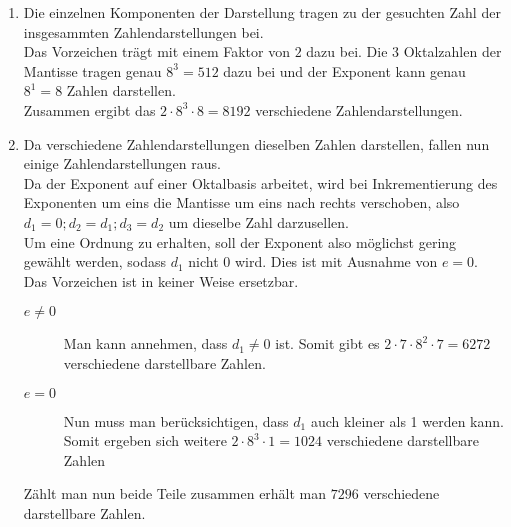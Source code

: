 \documentclass[a4paper,11pt]{article}             %
\begin{document}

\begin{enumerate}

\item Die einzelnen Komponenten der Darstellung tragen zu der gesuchten Zahl der insgesammten Zahlendarstellungen bei.\\
Das Vorzeichen trägt mit einem Faktor von $2$ dazu bei.
Die 3 Oktalzahlen der Mantisse tragen genau $8^3 = 512$ dazu bei
und der Exponent kann genau $8^1 = 8$ Zahlen darstellen.\\
Zusammen ergibt das $2 \cdot 8^3 \cdot 8 = 8192$ verschiedene Zahlendarstellungen.

\item Da verschiedene Zahlendarstellungen dieselben Zahlen darstellen, fallen nun einige Zahlendarstellungen raus.\\
Da der Exponent auf einer Oktalbasis arbeitet, wird bei Inkrementierung des Exponenten um eins die Mantisse um eins nach rechts verschoben, also $d_1 = 0; d_2 = d_1; d_3 = d_2$ um dieselbe Zahl darzusellen.\\
Um eine Ordnung zu erhalten, soll der Exponent also möglichst gering gewählt werden, sodass $d_1$ nicht 0 wird. Dies ist mit Ausnahme von $e=0$.\\
Das Vorzeichen ist in keiner Weise ersetzbar.
\begin{description}
\item [$e \neq 0$]
Man kann annehmen, dass $d_1 \neq 0$ ist. Somit gibt es $2 \cdot 7 \cdot 8^2 \cdot 7 = 6272$ verschiedene darstellbare Zahlen.
\item [$e = 0$]
Nun muss man berücksichtigen, dass $d_1$ auch kleiner als 1 werden kann. Somit ergeben sich weitere $2 \cdot 8^3 \cdot 1 = 1024$ verschiedene darstellbare Zahlen
\end{description}
Zählt man nun beide Teile zusammen erhält man $7296$ verschiedene darstellbare Zahlen.

\end{enumerate}
\end{document}
